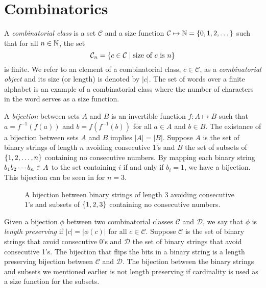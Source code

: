 \label{ch:backgr}
\section{Combinatorics\label{sec:combinatorics}}
A \emph{combinatorial class} is a set $\mathcal{C}$ and a size function $\mathcal{C} \mapsto \mathbb{N} = \left\{0,1,2,\dotsc\right\}$ such that for all $n\in\mathbb{N}$, the set
\[
    \mathcal{C}_n = \left\{c \in \mathcal{C} \mid \text{size of $c$ is $n$}\right\}
\]
is finite. We refer to an element of a combinatorial class, $c\in\mathcal{C}$, as a \emph{combinatorial object} and its size (or length) is denoted by $|c|$. The set of words over a finite alphabet is an example of a combinatorial class where the number of characters in the word serves as a size function.

A \emph{bijection} between sets $A$ and $B$ is an invertible function $f: A \mapsto B$ such that $a=f^{-1}(f(a))$ and $b=f(f^{-1}(b))$ for all $a\in A$ and $b \in B$. The existance of a bijection between sets $A$ and $B$ implies $|A|=|B|$. Suppose $A$ is the set of binary strings of length $n$ avoiding consecutive 1's and $B$ the set of subsets of $\left\{1,2,\dotsc,n\right\}$ containing no consecutive numbers. By mapping each binary string $b_1 b_2 \dotsm b_{n} \in A$ to the set containing $i$ if and only if $b_i=1$, we have a bijection. This bijection can be seen in  for $n=3$.

\begin{figure}[ht!]
    \centering
    
    \caption{A bijection between binary strings of length 3 avoiding consecutive 1's and subsets of $\left\{1,2,3\right\}$ containing no consecutive numbers.}
    \label{fig:bijection_example}
\end{figure}

Given a bijection $\phi$ between two combinatorial classes $\mathcal{C}$ and $\mathcal{D}$, we say that $\phi$ is \emph{length preserving} if $|c| = |\phi(c)|$ for all $c\in\mathcal{C}$. Suppose $\mathcal{C}$ is the set of binary strings that avoid consecutive 0's and $\mathcal{D}$ the set of binary strings that avoid consecutive 1's. The bijection that flips the bits in a binary string is a length preserving bijection between $\mathcal{C}$ and $\mathcal{D}$. The bijection between the binary strings and subsets we mentioned earlier is not length preserving if cardinality is used as a size function for the subsets.

